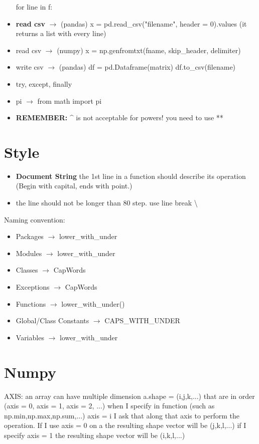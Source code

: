 \documentclass{article}
\begin{document}
\begin{multicols}{2}
\begin{itemize}
                                for line in f:
\item \textbf{read csv} $\rightarrow$ (pandas) x = pd.read\_csv("filename", header = 0).values (it returns a list with every line)
\item read csv $\rightarrow$ (numpy) x = np.genfromtxt(fname, skip\_header, delimiter)
\item write csv $\rightarrow$ (pandas) df = pd.Dataframe(matrix)
                                    df.to\_csv(filename)
\item try, except, finally
\item pi $\rightarrow$ from math import pi
\item \textbf{REMEMBER:} \^{} is not acceptable for powers! you need to use **
\end{itemize}
\section{Style}
\begin{itemize}
\item \textbf{Document String} the 1st line in a function should describe its operation (Begin with capital, ends with point.) \cite{Google}
\item the line should not be longer than 80 step. use line break \textbackslash
\end{itemize}

Naming convention:
\begin{itemize}
\item Packages $\rightarrow$ lower\_with\_under
\item Modules $\rightarrow$ lower\_with\_under
\item Classes $\rightarrow$ CapWords
\item Exceptions $\rightarrow$ CapWords
\item Functions $\rightarrow$ lower\_with\_under()
\item Global/Class Constants $\rightarrow$ CAPS\_WITH\_UNDER
\item Variables $\rightarrow$ lower\_with\_under
\end{itemize}
\section{Numpy}
AXIS: an array can have multiple dimension a.shape = (i,j,k,...) that are in order (axis = 0, axis = 1, axis = 2, ...)
when I specify in function (such as np.min,np.max,np.sum,...) axis = i I ask that along that axis to perform the operation.
If I use axis = 0 on a the resulting shape vector will be (j,k,l,...) if I specify axis = 1 the resulting shape vector will be (i,k,l,...)


\end{multicols}
\end{document}
